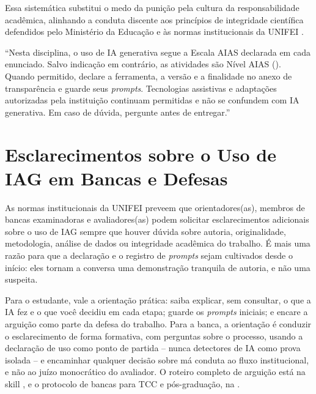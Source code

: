 Essa sistem{\'a}tica substitui o medo da puni{\c c}{\~a}o pela cultura da responsabilidade acad{\^e}mica, alinhando a conduta discente aos princ{\'i}pios de integridade cient{\'i}fica defendidos pelo Minist{\'e}rio da Educa{\c c}{\~a}o \cite{brasil2026referencial} e {\`a}s normas institucionais da UNIFEI \cite{unifei2026guia}.

\begin{tcolorbox}[colback=white, colframe=boxborder, arc=1mm, title={Texto pronto para o plano de ensino (copie e adapte)}]
\small
``Nesta disciplina, o uso de IA generativa segue a Escala AIAS declarada em cada enunciado. Salvo indica{\c c}{\~a}o em contr{\'a}rio, as atividades s{\~a}o N{\'i}vel AIAS \underline{\hspace{1cm}} (\underline{\hspace{4cm}}). Quando permitido, declare a ferramenta, a vers{\~a}o e a finalidade no anexo de transpar{\^e}ncia e guarde seus \emph{prompts}. Tecnologias assistivas e adapta{\c c}{\~o}es autorizadas pela institui{\c c}{\~a}o continuam permitidas e n{\~a}o se confundem com IA generativa. Em caso de d{\'u}vida, pergunte antes de entregar.''
\end{tcolorbox}

\section{Esclarecimentos sobre o Uso de IAG em Bancas e Defesas}

As normas institucionais da UNIFEI \cite{unifei2026guia} preveem que orientadores(as), membros de bancas examinadoras e avaliadores(as) podem solicitar esclarecimentos adicionais sobre o uso de IAG sempre que houver d{\'u}vida sobre autoria, originalidade, metodologia, an{\'a}lise de dados ou integridade acad{\^e}mica do trabalho. {\'E} mais uma raz{\~a}o para que a declara{\c c}{\~a}o e o registro de \emph{prompts} sejam cultivados desde o in{\'i}cio: eles tornam a conversa uma demonstra{\c c}{\~a}o tranquila de autoria, e n{\~a}o uma suspeita.

Para o estudante, vale a orienta{\c c}{\~a}o pr{\'a}tica: saiba explicar, sem consultar, o que a IA fez e o que voc{\^e} decidiu em cada etapa; guarde os \emph{prompts} iniciais; e encare a argui{\c c}{\~a}o como parte da defesa do trabalho. Para a banca, a orienta{\c c}{\~a}o {\'e} conduzir o esclarecimento de forma formativa, com perguntas sobre o processo, usando a declara{\c c}{\~a}o de uso como ponto de partida -- nunca detectores de IA como prova isolada -- e encaminhar qualquer decis{\~a}o sobre m{\'a} conduta ao fluxo institucional, e n{\~a}o ao ju{\'i}zo monocr{\'a}tico do avaliador. O roteiro completo de argui{\c c}{\~a}o est{\'a} na skill , e o protocolo de bancas para TCC e p{\'o}s-gradua{\c c}{\~a}o, na .
